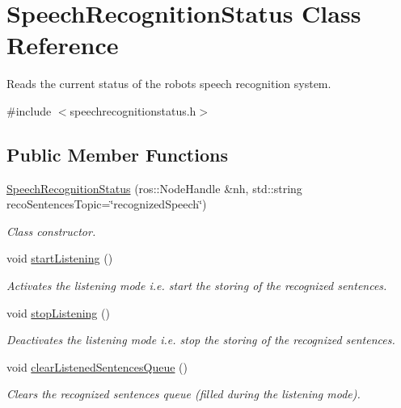 \hypertarget{class_speech_recognition_status}{}\section{Speech\+Recognition\+Status Class Reference}
\label{class_speech_recognition_status}


Reads the current status of the robot\textquotesingle{}s speech recognition system.  




{\ttfamily \#include $<$speechrecognitionstatus.\+h$>$}

\subsection*{Public Member Functions}
\begin{DoxyCompactItemize}
\item 
\hyperlink{class_speech_recognition_status_a75c7b8a734159b35396b4255c6b64069}{Speech\+Recognition\+Status} (ros\+::\+Node\+Handle \&nh, std\+::string reco\+Sentences\+Topic=\char`\"{}recognized\+Speech\char`\"{})
\begin{DoxyCompactList}\small\item\em Class constructor. \end{DoxyCompactList}\item 
void \hyperlink{class_speech_recognition_status_a87b7f32cce3498ccaf34792d4557f23f}{start\+Listening} ()\hypertarget{class_speech_recognition_status_a87b7f32cce3498ccaf34792d4557f23f}{}\label{class_speech_recognition_status_a87b7f32cce3498ccaf34792d4557f23f}

\begin{DoxyCompactList}\small\item\em Activates the listening mode i.\+e. start the storing of the recognized sentences. \end{DoxyCompactList}\item 
void \hyperlink{class_speech_recognition_status_acdd801807e5fac5a6e68b1aed8c7ca22}{stop\+Listening} ()\hypertarget{class_speech_recognition_status_acdd801807e5fac5a6e68b1aed8c7ca22}{}\label{class_speech_recognition_status_acdd801807e5fac5a6e68b1aed8c7ca22}

\begin{DoxyCompactList}\small\item\em Deactivates the listening mode i.\+e. stop the storing of the recognized sentences. \end{DoxyCompactList}\item 
void \hyperlink{class_speech_recognition_status_a6cb03e02b0b474d9361a4b546c2c103a}{clear\+Listened\+Sentences\+Queue} ()
\begin{DoxyCompactList}\small\item\em Clears the recognized sentences queue (filled during the listening mode). \end{DoxyCompactList}\end{DoxyCompactItemize}


